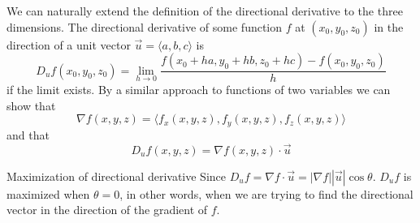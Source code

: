 \documentclass{article}
\begin{document}
	We can naturally extend the definition of the directional derivative to the three
	dimensions. The directional derivative of some function $f$ at
	$(x_{0},y_{0},z_{0})$ in the direction of a unit vector
	$\vec{u}=\langle a,b,c \rangle$ is
	\[
		D_{u}f(x_{0},y_{0},z_{0}) = \lim_{h \to 0}\frac{f(x_{0} + ha, y_{0} + hb, z_{0}
		+ hc) - f(x_{0},y_{0},z_{0})}{h}
	\]
	if the limit exists. By a similar approach to functions of two variables we can
	show that
	\[
		\nabla f(x,y,z) = \langle f_{x}(x,y,z),f_{y}(x,y,z),f_{z}(x,y,z) \rangle
	\]
	and that
	\[
		D_{u} f(x,y,z) = \nabla f(x,y,z) \cdot \vec{u}
	\]
	\begin{mybox}
		{Maximization of directional derivative} Since $D_{u}f = \nabla f \cdot \vec{u}
		= |\nabla f||\vec{u}|\cos\theta$. $D_{u}f$ is maximized when $\theta = 0$, in
		other words, when we are trying to find the directional vector in the
		direction of the gradient of $f$.
	\end{mybox}
\end{document}
